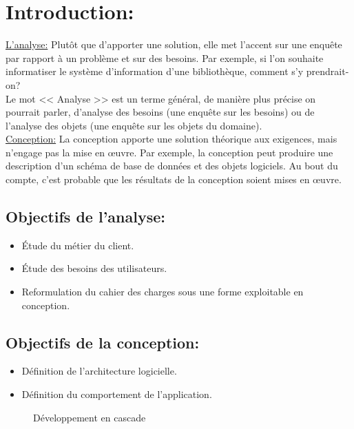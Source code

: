 \documentclass[12pt]{report}
\begin{document}
\newpage

\section{Introduction:}
\vspace{0.2in}
\uline{L’analyse:} Plutôt que d’apporter une solution, elle met l’accent sur une enquête par rapport à un problème et sur des besoins. Par exemple, si l’on souhaite informatiser le système d’information d’une bibliothèque, comment s’y prendrait-on?
\\
Le mot << Analyse >> est un terme général, de manière plus précise on pourrait parler, d’analyse des besoins (une enquête sur les besoins) ou de l’analyse des objets (une enquête sur les objets du domaine).
\\
\uline{Conception:} La conception apporte une solution théorique aux exigences, mais n’engage pas la mise en œuvre. Par exemple, la conception peut produire une description d’un schéma de base de données et des objets logiciels. Au bout du compte, c’est probable que les résultats de la conception soient mises en œuvre.

\vspace{-0.1in}

\subsection{Objectifs de l’analyse:}
\begin{itemize}
    \item Étude du m\'etier du client.
    \item Étude des besoins des utilisateurs.
    \item Reformulation du cahier des charges sous une forme exploitable en conception.
\end{itemize}

\vspace{-0.15in}

\subsection{Objectifs de la conception:}
\begin{itemize}
    \item D\'efinition de l’architecture logicielle.
    \item D\'efinition du comportement de l’application.
\end{itemize}

\begin{figure}[h]
\centering
\caption{Développement en cascade}
\end{figure}
\end{document}
